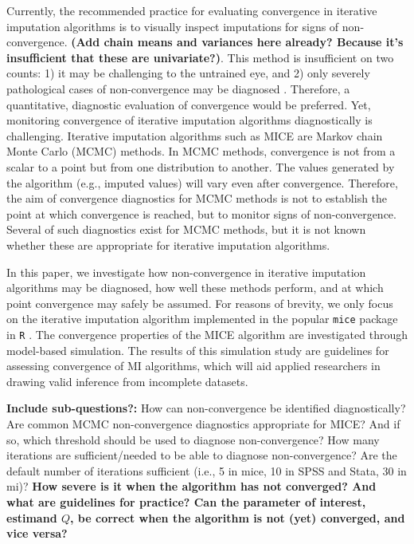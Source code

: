 \documentclass[Royal,times,sageh]{sagej}
\begin{document}
Currently, the recommended practice for evaluating convergence in
iterative imputation algorithms is to visually inspect imputations for
signs of non-convergence. \textbf{(Add chain means and variances here
already? Because it's insufficient that these are univariate?)}. This
method is insufficient on two counts: 1) it may be challenging to the
untrained eye, and 2) only severely pathological cases of
non-convergence may be diagnosed \citep[\(\S\) 6.5.2]{buur18}.
Therefore, a quantitative, diagnostic evaluation of convergence would be
preferred. Yet, monitoring convergence of iterative imputation
algorithms diagnostically is challenging. Iterative imputation
algorithms such as MICE are Markov chain Monte Carlo (MCMC) methods. In
MCMC methods, convergence is not from a scalar to a point but from one
distribution to another. The values generated by the algorithm (e.g.,
imputed values) will vary even after convergence. Therefore, the aim of
convergence diagnostics for MCMC methods is not to establish the point
at which convergence is reached, but to monitor signs of
non-convergence. Several of such diagnostics exist for MCMC methods, but
it is not known whether these are appropriate for iterative imputation
algorithms.

In this paper, we investigate how non-convergence in iterative
imputation algorithms may be diagnosed, how well these methods perform,
and at which point convergence may safely be assumed. For reasons of
brevity, we only focus on the iterative imputation algorithm implemented
in the popular \texttt{mice} package \citep{mice} in \texttt{R}
\citep{R}. The convergence properties of the MICE algorithm are
investigated through model-based simulation. The results of this
simulation study are guidelines for assessing convergence of MI
algorithms, which will aid applied researchers in drawing valid
inference from incomplete datasets.

\textbf{Include sub-questions?:} How can non-convergence be identified
diagnostically? Are common MCMC non-convergence diagnostics appropriate
for MICE? And if so, which threshold should be used to diagnose
non-convergence? How many iterations are sufficient/needed to be able to
diagnose non-convergence? Are the default number of iterations
sufficient (i.e., 5 in mice, 10 in SPSS and Stata, 30 in mi)?
\textbf{How severe is it when the algorithm has not converged? And what
are guidelines for practice? Can the parameter of interest, estimand
\(Q\), be correct when the algorithm is not (yet) converged, and vice
versa?}
\end{document}
